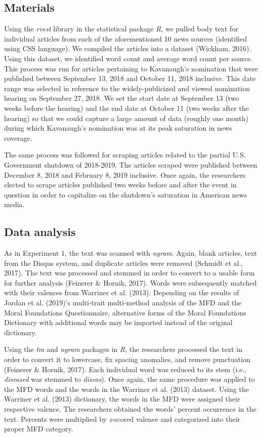 \documentclass[english,,man]{apa6}
\begin{document}
\subsection{Materials}\label{materials-1}

Using the \emph{rvest} library in the statistical package \emph{R}, we
pulled body text for individual articles from each of the aforementioned
10 news sources (identified using CSS language). We compiled the
articles into a dataset (Wickham, 2016). Using this dataset, we
identified word count and average word count per source. This process
was run for articles pertaining to Kavanaugh's nomination that were
published between September 13, 2018 and October 11, 2018 inclusive.
This date range was selected in reference to the widely-publicized and
viewed nomination hearing on September 27, 2018. We set the start date
at September 13 (two weeks before the hearing) and the end date at
October 11 (two weeks after the hearing) so that we could capture a
large amount of data (roughly one month) during which Kavanaugh's
nomination was at its peak saturation in news coverage.

The same process was followed for scraping articles related to the
partial U.S. Government shutdown of 2018-2019. The articles scraped were
published between December 8, 2018 and February 8, 2019 inclusive. Once
again, the researchers elected to scrape articles published two weeks
before and after the event in question in order to capitalize on the
shutdown's saturation in American news media.

\subsection{Data analysis}\label{data-analysis-1}

As in Experiment 1, the text was scanned with \emph{ngram}. Again, blank
articles, text from the Disqus system, and duplicate articles were
removed (Schmidt et al., 2017). The text was processed and stemmed in
order to convert to a usable form for further analysis (Feinerer \&
Hornik, 2017). Words were subsequently matched with their valences from
Warriner et al. (2013). Depending on the results of Jordan et al.
(2019)'s multi-trait multi-method analysis of the MFD and the Moral
Foundations Questionnaire, alternative forms of the Moral Foundations
Dictionary with additional words may be imported instead of the original
dictionary.

Using the \emph{tm} and \emph{ngram} packages in \emph{R}, the
researchers processed the text in order to convert it to lowercase, fix
spacing anomalies, and remove punctuation (Feinerer \& Hornik, 2017).
Each individual word was reduced to its stem (i.e., \emph{diseased} was
stemmed to \emph{diseas}). Once again, the same procedure was applied to
the MFD words and the words in the Warriner et al. (2013) dataset. Using
the Warriner et al. (2013) dictionary, the words in the MFD were
assigned their respective valence. The researchers obtained the words'
percent occurrence in the text. Percents were multiplied by
\emph{z}-scored valence and categorized into their proper MFD category.
\end{document}
